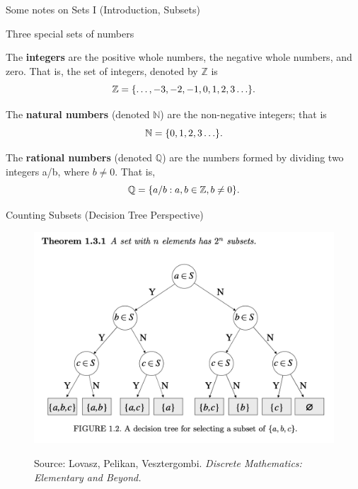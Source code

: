 \documentclass[10pt]{beamer}
\begin{document}
\begin{frame}[standout]
Some notes on Sets I (Introduction, Subsets) 
\end{frame}




\begin{frame}{Three special sets of numbers}

\begin{mygreenbox}[title=Definition]
The \textbf{integers} are the positive whole numbers, the negative whole numbers, and zero.  That is, the set of integers, denoted by $\mathbb{Z}$ is
\[\mathbb{Z} = \{ {\hdots, -3, -2, -1, 0, 1, 2, 3 \hdots} \}.\] 
\end{mygreenbox}
\vfill 
\begin{mygreenbox}[title=Definition]
The \textbf{natural numbers} (denoted $\mathbb{N}$) are the non-negative integers; that is
\[\mathbb{N} = \{ {0, 1, 2, 3 \hdots} \}.\] 
\end{mygreenbox}
\vfill 
\begin{mygreenbox}[title=Definition]
The \textbf{rational numbers} (denoted $\mathbb{Q}$)  are the numbers formed by dividing two integers a/b, where $b \neq 0$.  That is,
\[\mathbb{Q} = \{ {a/b : a,b \in \mathbb{Z}, b \neq 0} \}.\] 
\end{mygreenbox}
\end{frame}




\begin{frame}{Counting Subsets (Decision Tree Perspective)}

\begin{figure}
\includegraphics[width=.9\textwidth]{images/decision_tree}

\tiny Source: Lovasz, Pelikan, Vesztergombi. \textit{Discrete Mathematics: Elementary and Beyond.} 	
\end{figure}

\end{frame}
\end{document}
